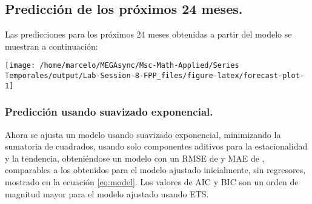 \documentclass[]{article}
\newenvironment{Shaded}{\begin{snugshade}}{\end{snugshade}}
\newcommand{\DataTypeTok}[1]{\textcolor[rgb]{0.13,0.29,0.53}{#1}}
\newcommand{\DecValTok}[1]{\textcolor[rgb]{0.00,0.00,0.81}{#1}}
\newcommand{\KeywordTok}[1]{\textcolor[rgb]{0.13,0.29,0.53}{\textbf{#1}}}
\newcommand{\NormalTok}[1]{#1}
\newcommand{\OperatorTok}[1]{\textcolor[rgb]{0.81,0.36,0.00}{\textbf{#1}}}
\newcommand{\StringTok}[1]{\textcolor[rgb]{0.31,0.60,0.02}{#1}}
\begin{document}
\hypertarget{predicciuxf3n-de-los-pruxf3ximos-24-meses.}{%
\subsection{Predicción de los próximos 24 meses.}\label{predicciuxf3n-de-los-pruxf3ximos-24-meses.}}

Las predicciones para los próximos 24 meses obtenidas a partir del modelo se muestran a continuación:

\begin{Shaded}
\end{Shaded}

\begin{center}\texttt{[image: /home/marcelo/MEGAsync/Msc-Math-Applied/Series Temporales/output/Lab-Session-8-FPP\_files/figure-latex/forecast-plot-1]} \end{center}

\hypertarget{predicciuxf3n-usando-suavizado-exponencial.}{%
\subsubsection{Predicción usando suavizado exponencial.}\label{predicciuxf3n-usando-suavizado-exponencial.}}

Ahora se ajusta un modelo usando suavizado exponencial, minimizando la sumatoria de cuadrados, usando solo componentes aditivos para la estacionalidad y la tendencia, obteniéndose un modelo con un RMSE de  y MAE de , comparables a los obtenidos para el modelo ajustado inicialmente, sin regresores, mostrado en la ecuación \eqref{eq:model}.
Los valores de AIC y BIC son un orden de magnitud mayor para el modelo ajustado usando ETS.
\end{document}

